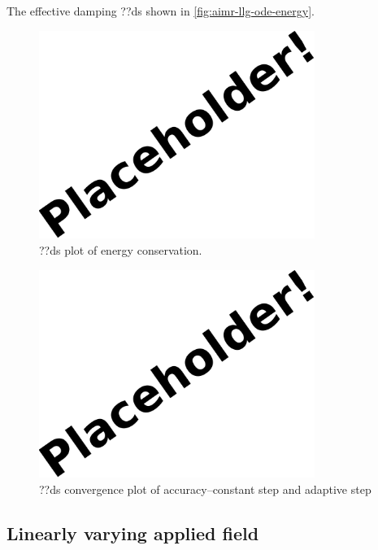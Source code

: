 The effective damping ??ds shown in \autoref{fig:aimr-llg-ode-energy}.

\begin{figure}[tbp]
  \centering
  \includegraphics[width=0.8\textwidth]{images/placeholder}
  \caption{??ds plot of energy conservation.}
  \label{fig:aimr-llg-ode-energy}
\end{figure}


\begin{figure}[tbp]
  \centering
  \includegraphics[width=0.8\textwidth]{images/placeholder}
  \caption{??ds convergence plot of accuracy--constant step and adaptive step}
  \label{fig:imr-llg-ode-accury}
\end{figure}





\subsection{Linearly varying applied field}


